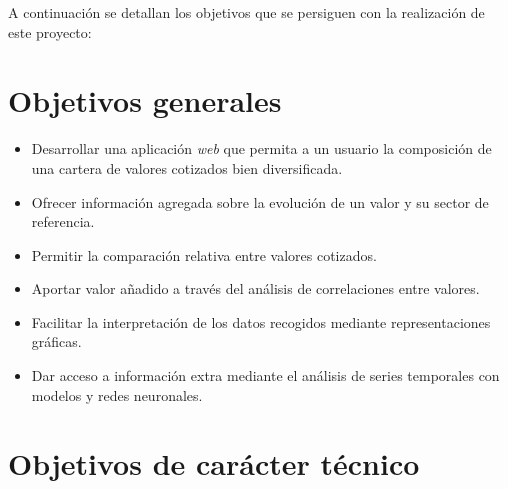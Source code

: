 
A continuación se detallan los objetivos que se persiguen con la realización de este
 proyecto:


\section{Objetivos generales}\label{objetivos_generales}

\begin{itemize}
\tightlist
\item
Desarrollar una aplicación \emph{web} que permita a un usuario la composición
 de una cartera de valores cotizados bien diversificada. 
\item
Ofrecer información agregada sobre la evolución de un valor y su sector
 de referencia. 
\item
Permitir la comparación relativa entre valores cotizados. 
\item
Aportar valor añadido a través del análisis de correlaciones entre valores. 
\item
Facilitar la interpretación de los datos recogidos mediante
 representaciones gráficas.
\item
Dar acceso a información extra mediante el análisis de series temporales con
 modelos y redes neuronales. 
\end{itemize}

\section{Objetivos de carácter técnico}\label{objetivos_tecnicos}

